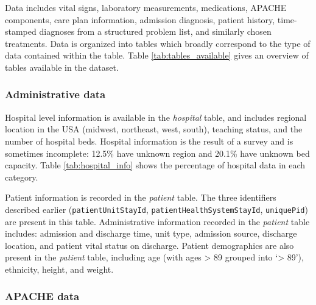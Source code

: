 \documentclass[english]{article}
\newcommand{\colname}[1]{\texttt{#1}}
\newcommand{\tblname}[1]{\emph{#1}}
\begin{document}
Data includes vital signs, laboratory measurements, medications, APACHE
components, care plan information, admission diagnosis, patient history,
time-stamped diagnoses from a structured problem list, and similarly
chosen treatments. Data is organized into tables which broadly
correspond to the type of data contained within the table. Table \ref{tab:tables_available} gives
an overview of tables available in the dataset.

\subsubsection*{Administrative data}\label{administrative-data}

Hospital level information is available in the \tblname{hospital} table, and includes regional location in the USA (midwest, northeast, west, south), teaching status, and the number of hospital beds. Hospital information is the result of a survey and is sometimes incomplete: 12.5\% have unknown region and 20.1\% have unknown bed capacity. Table \ref{tab:hospital_info} shows the percentage of hospital data in each category.

Patient information is recorded in the \tblname{patient} table. The three identifiers described earlier (\colname{patientUnitStayId}, \colname{patientHealthSystemStayId}, \colname{uniquePid}) are present in this table. Administrative information recorded in the \tblname{patient} table includes: admission and discharge time, unit type, admission source, discharge location, and patient vital status on discharge. Patient demographics are also present in the \tblname{patient} table, including age (with ages \textgreater{} 89 grouped into `\textgreater{} 89'), ethnicity, height, and weight.

\subsubsection*{APACHE data}\label{apache-data}
\end{document}
